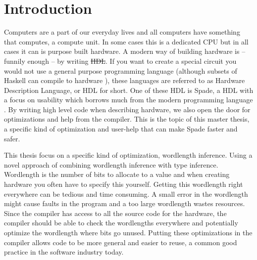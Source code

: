 \documentclass[msc,lith,english]{liuthesis}
\author{Edvard Thörnros}
\providecommand{\DIFadd}[1]{{\protect\color{blue}\uwave{#1}}} %
\providecommand{\DIFdel}[1]{{\protect\color{red}\sout{#1}}}                      %
\providecommand{\DIFaddbegin}{} %
\providecommand{\DIFaddend}{} %
\providecommand{\DIFdelbegin}{} %
\providecommand{\DIFdelend}{} %
\begin{document}
\chapter{Introduction}
\label{chaIntro}
Computers are a part of our everyday lives and all computers have something that computes, a compute unit. In some cases this is a dedicated CPU but in all cases it can is purpose built hardware. A modern way of building hardware is -- funnily enough -- by writing \DIFdelbegin \DIFdel{HDL}\DIFdelend \DIFaddbegin \DIFadd{programs that can be mapped to hardware}\DIFaddend . If you want to create a special circuit you would not use a general purpose programming language (although subsets of Haskell can compile to hardware \cite{src:ClashExists}), these languages are referred to as Hardware Description Language, or HDL for short. One of these HDL is Spade, a HDL with a focus on usability which borrows much from the modern programming language \cite{src:spadeSomething} \cite{src:spadeAnHDL}. By writing high level code when describing hardware, we also open the door for optimizations and help from the compiler. This is the topic of this master thesis, a specific kind of optimization and user-help that can make Spade faster and safer.

This thesis focus on a specific kind of optimization, wordlength inference. Using a novel approach of combining wordlength inference with type inference. Wordlength is the number of bits to allocate to a value and when creating hardware you often have to specify this yourself. Getting this wordlength right everywhere can be tedious and time consuming. A small error in the wordlength might cause faults in the program and a too large wordlength wastes resources. %
Since the compiler has access to all the source code for the hardware, the compiler should be able to check the wordlengths everywhere and potentially optimize the wordlength where bits go unused. Putting these optimizations in the compiler allows code to be more general and easier to reuse, a common good practice in the software industry today. 
\end{document}
